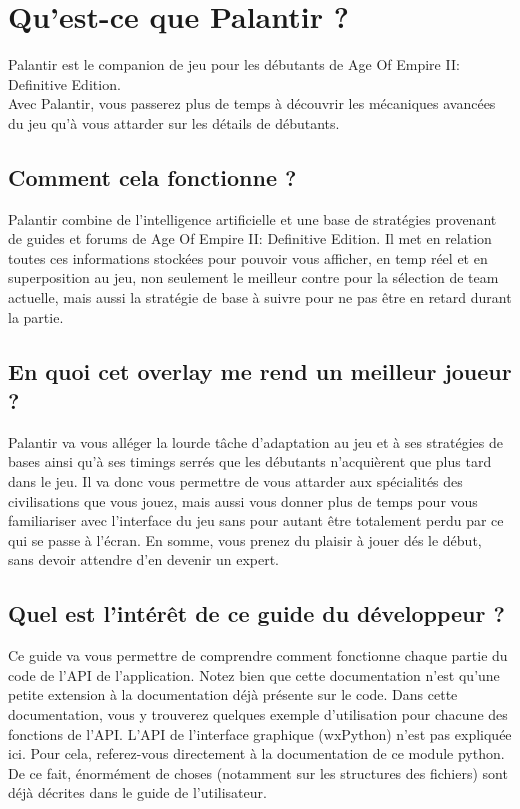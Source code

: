 
\section{Qu'est-ce que Palantir ?}
Palantir est le companion de jeu pour les débutants de Age Of Empire II: Definitive Edition.\\

Avec Palantir, vous passerez plus de temps à découvrir les mécaniques avancées du jeu qu'à vous attarder sur les détails de débutants.

\subsection{Comment cela fonctionne ?}
Palantir combine de l'intelligence artificielle et une base de stratégies provenant de guides et forums de Age Of Empire II: Definitive Edition. Il met en relation toutes ces informations stockées pour pouvoir vous afficher, en temp réel et en superposition au jeu, non seulement le meilleur contre pour la sélection de team actuelle, mais aussi la stratégie de base à suivre pour ne pas être en retard durant la partie.

\subsection{En quoi cet overlay me rend un meilleur joueur ?}
Palantir va vous alléger la lourde tâche d'adaptation au jeu et à ses stratégies de bases ainsi qu'à ses timings serrés que les débutants n'acquièrent que plus tard dans le jeu. Il va donc vous permettre de vous attarder aux spécialités des civilisations que vous jouez, mais aussi vous donner plus de temps pour vous familiariser avec l'interface du jeu sans pour autant être totalement perdu par ce qui se passe à l'écran. En somme, vous prenez du plaisir à jouer dés le début, sans devoir attendre d'en devenir un expert.

\subsection{Quel est l'intérêt de ce guide du développeur ?}
Ce guide va vous permettre de comprendre comment fonctionne chaque partie du code de l'API de l'application. Notez bien que cette documentation n'est qu'une petite extension à la documentation déjà présente sur le code. Dans cette documentation, vous y trouverez quelques exemple d'utilisation pour chacune des fonctions de l'API. L'API de l'interface graphique (wxPython) n'est pas expliquée ici. Pour cela, referez-vous directement à la documentation de ce module python. De ce fait, énormément de choses (notamment sur les structures des fichiers) sont déjà décrites dans le guide de l'utilisateur.